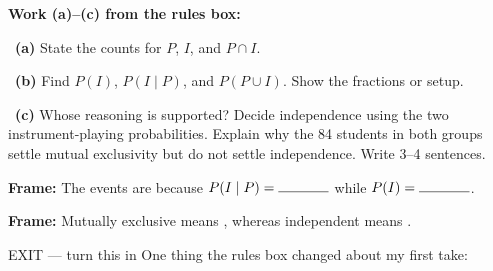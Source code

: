 \documentclass[11pt]{article}
\begin{document}
\newpage
\textbf{Work (a)--(c) from the rules box:}\par\smallskip

~\textbf{(a)} State the counts for $P$, $I$, and $P\cap I$.\par
\workspace{0.7in}

~\textbf{(b)} Find $P(I)$, $P(I\mid P)$, and $P(P\cup I)$. Show the fractions or setup.\par
\workspace{1.4in}

~\textbf{(c)} Whose reasoning is supported? Decide independence using the two instrument-playing probabilities. Explain why the 84 students in both groups settle mutual exclusivity but do not settle independence. Write 3--4 sentences.\par
\workspace{2.0in}

\begin{sentenceframebox}\raggedright\textbf{Frame:} The events are \blank[0.9in] because $P(I\mid P)=\blank[0.5in]$ while $P(I)=\blank[0.5in]$.\end{sentenceframebox}

\begin{sentenceframebox}\raggedright\textbf{Frame:} Mutually exclusive means \blank[1.8in], whereas independent means \blank[2.0in].\end{sentenceframebox}

\begin{summaryexitbox}{EXIT --- turn this in}
One thing the rules box changed about my first take: \hrulefill\par
\workspace{0.4in}
\end{summaryexitbox}
\end{document}
